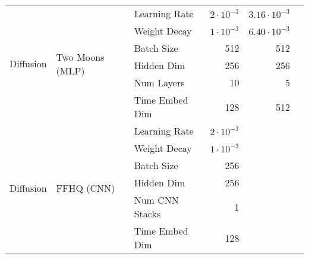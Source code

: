 \documentclass{article}
\begin{document}
\begin{table}[H]
\begin{tabular}{lllrrr}
		\midrule
		\multirow{6}{*}{Diffusion}     & \multirow{6}{*}{Two Moons (MLP)}
		                               & Learning Rate                    & $2\cdot10^{-3}$         & $3.16\cdot10^{-3}$                       \\
		                               &                                  & Weight Decay            & $1\cdot10^{-3}$    & $6.40\cdot10^{-3}$  \\
		                               &                                  & Batch Size              & 512                & 512                 \\
		                               &                                  & Hidden Dim              & 256                & 256                 \\
		                               &                                  & Num Layers              & 10                 & 5                   \\
		                               &                                  & Time Embed Dim          & 128                & 512                 \\
		\midrule
		\multirow{6}{*}{Diffusion}     & \multirow{6}{*}{FFHQ (CNN)}
		                               & Learning Rate                    & $2\cdot10^{-3}$         &                                          \\
		                               &                                  & Weight Decay            & $1\cdot10^{-3}$    &                     \\
		                               &                                  & Batch Size              & 256                &                     \\
		                               &                                  & Hidden Dim              & 256                &                     \\
		                               &                                  & Num CNN Stacks          & 1                  &                     \\
		                               &                                  & Time Embed Dim          & 128                &                     \\
		\bottomrule
	\end{tabular}
\end{table}



\end{document}
